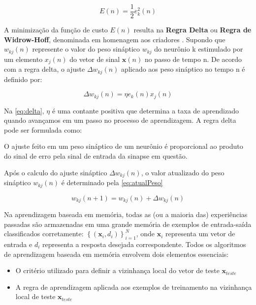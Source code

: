 \begin{equation} \label{eq:custo}
    E(n) = \frac{1}{2}e_{k}^{2}(n)
\end{equation}

A minimização da função de custo $E(n)$ resulta na \textbf{Regra Delta} ou \textbf{Regra de Widrow-Hoff}, denominada em homenagem aos criadores \cite{widrow1960adaptive}. Supondo que $w_{kj}(n)$ represente o valor do peso sináptico $w_{kj}$ do neurônio k estimulado por um elemento $x_{j}(n)$ do vetor de sinal $\textbf{x}(n)$ no passo de tempo n. De acordo com a regra delta, o ajuste $\Delta w_{kj}(n)$ aplicado aos peso sináptico no tempo n é definido por:

\begin{equation} \label{eq:delta}
    \Delta w_{kj}(n) = \eta e_{k}(n)x_{j}(n)
\end{equation}

Na \autoref{eq:delta}, $\eta$ é uma contante positiva que determina a taxa de aprendizado quando avançamos em um passo no processo de aprendizagem. A regra delta pode ser formulada como: 
    
    \begin{citacao}
        O ajuste feito em um peso sináptico de um neurônio é proporcional ao produto do sinal de erro pela sinal de entrada da sinapse em questão. \cite{haykin2001redes}
    \end{citacao}

Após o calculo do ajuste sináptico $\Delta w_{kj}(n)$, o valor atualizado do peso sináptico $w_{kj}(n)$ é determinado pela  \autoref{eq:atualPeso}

\begin{equation} \label{eq:atualPeso}
    w_{kj}(n+1) = w_{kj}(n) + \Delta w_{kj}(n)
\end{equation}

Na aprendizagem baseada em memória, todas as (ou a maioria das) experiências passadas são armazenadas em uma grande memória de exemplos de entrada-saída classificados corretamente: $\left \{ \left ( \textbf{x}_{i}, d_{i} \right ) \right \}_{i=1}^{N}$, onde $\textbf{x}_{i}$ representa um vetor de entrada e $d_{i}$ representa a resposta desejada correspondente. Todos os algoritmos de aprendizagem baseada em memória envolvem dois elementos essenciais:
    
    \begin{itemize}
        \item O critério utilizado para definir a vizinhança local do vetor de teste $\textbf{x}_{teste}$
        \item A regra de aprendizagem aplicada aos exemplos de treinamento na vizinhança local de teste $\textbf{x}_{teste}$
    \end{itemize}

